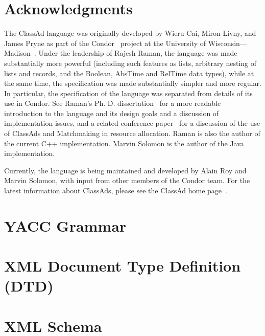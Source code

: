 \documentclass{article}
\begin{document}
\section{Acknowledgments}

The ClassAd language was originally developed by Wieru Cai, Miron Livny, and
James Pryne as part of the Condor~\cite{CONDOR_HOME,CONDOR_EXP,CONDOR_HUNT}
project at the University of Wisconsin---Madison~\cite{CLASSAD_ALPHA}.
Under the leadership of Rajesh Raman, the language was made substantially more
powerful (including such features as lists, arbitrary nesting of lists and
records, and the Boolean, AbsTime and RelTime data types), while at the
same time, the specification was made substantially simpler and more regular.
In particular, the specification of the language was separated from details
of its use in Condor.
See Raman's Ph. D. dissertation~\cite{RAMAN_THESIS} for a more readable
introduction to the language and its design goals and a discussion of
implementation issues, and a related conference paper~\cite{HPDC} for a
discussion of the use of ClassAds and Matchmaking in resource allocation.
Raman is also the author of the current C++ implementation.
Marvin Solomon is the author of the Java implementation.

Currently, the language is being maintained and developed by Alain Roy and
Marvin Solomon, with input from other members of the Condor team.
For the latest information about ClassAds, please see the ClassAd home
page~\cite{CLASSAD_HOME}.


 

\appendix
\section{YACC Grammar}
\label{sec:yacc}


\section{XML Document Type Definition (DTD)}
\label{sec:dtd}


\section{XML Schema}
\label{sec:schema}

\end{document}
